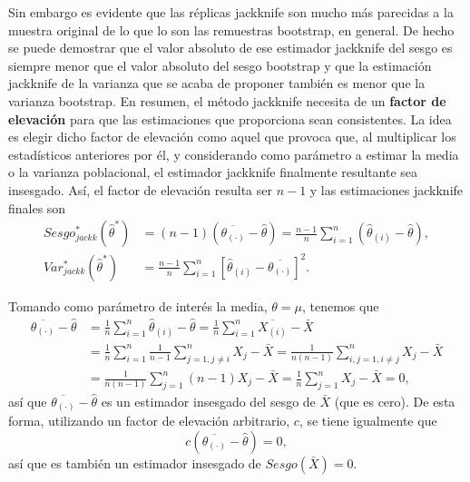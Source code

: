 \documentclass[
]{book}
\theoremstyle{break}
\theoremstyle{definition}
\theoremstyle{definition}
\theoremstyle{definition}
\theoremstyle{definition}
\theoremstyle{remark}
\begin{document}
Sin embargo es evidente que las réplicas jackknife son mucho más parecidas a la muestra original de lo que lo son las remuestras bootstrap, en general.
De hecho se puede demostrar que el valor absoluto de ese estimador jackknife del sesgo es siempre menor que el valor absoluto del sesgo bootstrap y que la estimación jackknife de la varianza que se acaba de proponer también es menor que la varianza bootstrap.
En resumen, el método jackknife necesita de un \textbf{factor de elevación} para que las estimaciones que proporciona sean consistentes.
La idea es elegir dicho factor de elevación como aquel que provoca que, al multiplicar los estadísticos anteriores por él, y considerando como parámetro a estimar la media o la varianza poblacional, el estimador jackknife finalmente resultante sea insesgado.
Así, el factor de elevación resulta ser \(n-1\) y las estimaciones jackknife finales son
\[\begin{aligned}
Sesgo_{jackk}^{\ast}\left( \hat{\theta}^{\ast} \right) 
&= \left( n-1 \right)\left( \overline{\theta_{(\cdot)}}-\hat{\theta} \right) 
= \frac{n-1}{n}\sum_{i=1}^{n}\left( \hat \theta_{(i)} - \hat{\theta} \right), \\
Var_{jackk}^{\ast}\left( \hat{\theta}^{\ast} \right) 
&= \frac{n-1}{n} \sum_{i=1}^{n}\left[ \hat \theta_{(i)} 
- \overline{\theta_{(\cdot)}}\right]^2.
\end{aligned}\]

Tomando como parámetro de interés la media, \(\theta =\mu\), tenemos que
\[\begin{aligned}
\overline{\theta_{(\cdot)}} - \hat{\theta} 
&= \frac{1}{n}\sum_{i=1}^{n}\hat \theta_{(i)} - \hat{\theta}
= \frac{1}{n}\sum_{i=1}^{n} \overline{X_{(i)}}-\bar{X} \\
&= \frac{1}{n}\sum_{i=1}^{n}\frac{1}{n-1}\sum_{j=1,j\neq i}^{n}X_j - \bar{X}
= \frac{1}{n\left( n-1 \right)}\sum_{i,j=1,i\neq j}^{n}X_j - \bar{X} \\
&= \frac{1}{n\left( n-1 \right)}\sum_{j=1}^{n}\left( n-1 \right) X_j- \bar{X}
= \frac{1}{n}\sum_{j=1}^{n}X_j-\bar{X}=0,
\end{aligned}\]
así que \(\overline{\theta_{(\cdot)}}-\hat{\theta}\) es un estimador insesgado del sesgo de \(\bar{X}\) (que es cero).
De esta forma, utilizando un factor de elevación arbitrario, \(c\), se tiene igualmente que
\[c\left( \overline{\theta_{(\cdot)}} - \hat{\theta} \right) = 0,\]
así que es también un estimador insesgado de \(Sesgo\left( \bar{X} \right) =0\).
\end{document}
